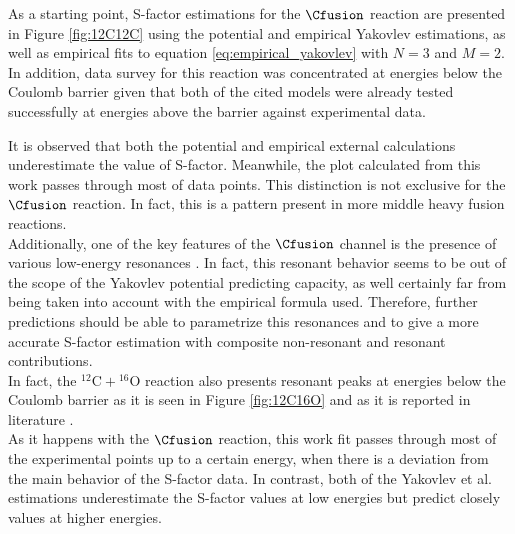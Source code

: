 \documentclass[openany]{book}
\begin{document}
As a starting point, S-factor estimations for the $\Cfusion$ reaction are presented in Figure \ref{fig:12C12C} using the potential and empirical Yakovlev estimations, as well as empirical fits to equation \ref{eq:empirical_yakovlev} with $N = 3$ and $M = 2$. In addition, data survey for this reaction was concentrated at energies below the Coulomb barrier given that both of the cited models were already tested successfully at energies above the barrier against experimental data.


It is observed that both the potential and empirical external calculations underestimate the value of S-factor. Meanwhile, the plot calculated from this work passes through most of data points. This distinction is not exclusive for the $\Cfusion$ reaction. In fact, this is a pattern present in more middle heavy fusion reactions. \\

Additionally, one of the key features of the $\Cfusion$ channel is the presence of various low-energy resonances \cite{notani_esbensen_fang_bucher_davies_jiang_lamm_lin_ma_martin_et_2012}. In fact, this resonant behavior seems to be out of the scope of the Yakovlev potential predicting capacity, as well certainly far from being taken into account with the empirical formula used.  Therefore, further predictions should be able to parametrize this resonances and to give a more accurate S-factor estimation with composite non-resonant and resonant contributions. \\

In fact, the $\mathrm{{}^{12}C + {}^{16}O}$ reaction also presents resonant peaks at energies below the Coulomb barrier as it is seen in Figure \ref{fig:12C16O} and as it is reported in literature \cite{torilov_maltsev_zherebchevsky_2021}. \\

As it happens with the $\Cfusion$ reaction, this work fit passes through most of the experimental points up to a certain energy, when there is a deviation from the main behavior of the S-factor data. In contrast, both of the Yakovlev et al. estimations underestimate the S-factor values at low energies but predict closely values at higher energies. \\
\end{document}
